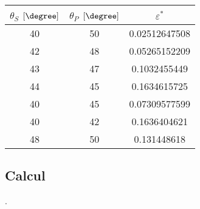 \begin{tabular}{|c|c|c|}
\hline 
$\theta_{S}$ $[\degree]$ & $\theta_{P}$ $[\degree]$ & $\varepsilon^{*}$ \\ 
\hline 
40 & 50 & 0.02512647508 \\ 
\hline 
42 & 48 & 0.05265152209 \\ 
\hline 
43 & 47 & 0.1032455449 \\ 
\hline 
44 & 45 & 0.1634615725 \\
\hline 
40 & 45 & 0.07309577599 \\
\hline 
40 & 42 & 0.1636404621 \\
\hline 
48 & 50 &  0.131448618 \\
\hline 
\end{tabular} 




\subsection*{Calcul}
.










